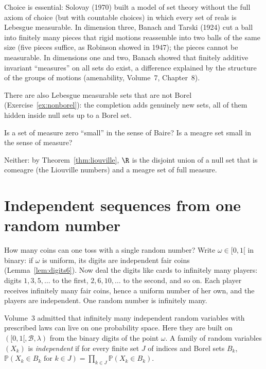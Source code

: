 Choice is essential: Solovay (1970) built a model of set theory without the full axiom of choice (but with countable choices) in which every set of
reals is Lebesgue measurable. In dimension three, Banach and Tarski (1924) cut a ball into finitely many pieces that rigid motions reassemble into two balls of
the same size (five pieces suffice, as Robinson showed in 1947); the pieces cannot be measurable. In dimensions one and two, Banach showed that finitely additive invariant ``measures'' on all sets do
exist, a difference explained by the structure of the groups of motions (amenability, Volume~7, Chapter~8).

There are also Lebesgue measurable sets that are not Borel (Exercise~\ref{ex:nonborel}): the completion adds genuinely new sets, all of them hidden inside null
sets up to a Borel set.

\begin{think}
Is a set of measure zero ``small'' in the sense of Baire? Is a meagre set small in the sense of measure?
\end{think}

Neither: by Theorem~\ref{thm:liouville}, $\R$ is the disjoint union of a null set that is comeagre (the Liouville numbers) and a meagre set of full measure.

\section{Independent sequences from one random number}

How many coins can one toss with a single random number? Write $\omega\in[0,1[$ in binary: if $\omega$ is uniform, its digits are
independent fair coins (Lemma~\ref{lem:digits6}). Now deal the digits like cards to infinitely many players: digits $1,3,5,\ldots$ to the
first, $2,6,10,\ldots$ to the second, and so on. Each player receives infinitely many fair coins, hence a uniform number of her own, and the
players are independent. One random number is infinitely many.

Volume~3 admitted that infinitely many independent random variables with prescribed laws can live on one probability space. Here they are built on
$([0,1[,\mathcal B,\lambda)$ from the binary digits of the point $\omega$. A family of random variables $(X_k)$ is \emph{independent} if for every finite set $J$ of indices and Borel sets $B_k$,
$\mathbb P(X_k\in B_k\text{ for }k\in J)=\prod_{k\in J}\mathbb P(X_k\in B_k)$.

